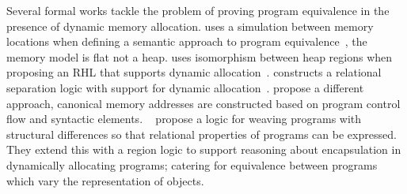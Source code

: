 \documentclass[runningheads,a4paper]{llncs}
\begin{document}
Several formal works tackle the problem of proving program equivalence in the presence of dynamic memory allocation. \citeauthor{Pitts2002} uses a simulation between memory locations when defining a semantic approach to program equivalence~\cite{Pitts2002}, the memory model is flat not a heap. \citeauthor{Benton2007} uses isomorphism between heap regions when proposing an RHL that supports dynamic allocation~\cite{Benton2007}. \citeauthor{Yang2007} constructs a relational separation logic with support for dynamic allocation~\cite{Yang2007}. \citeauthor{Sumner2010} propose a different approach, canonical memory addresses are constructed based on program control flow and syntactic elements. \citeauthor{Banerjee2016}~\cite{Banerjee2016} propose a logic for weaving programs with structural differences so that relational properties of programs can be expressed. They extend this with a region logic to support reasoning about encapsulation in dynamically allocating programs; catering for equivalence between programs which vary the representation of objects.
\end{document}

